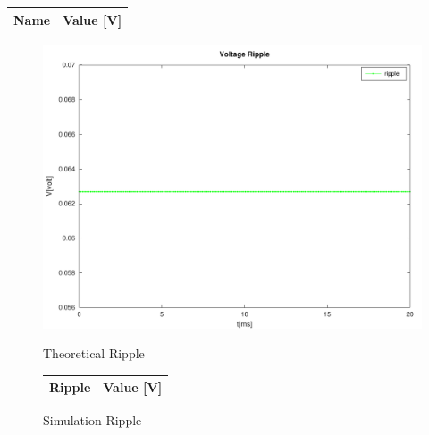 \begin{center}
  \begin{tabular}{ | c | c | }
    \hline    
    {\bf Name} & {\bf Value [V]} \\ \hline
    
  \end{tabular}
\end{center}

\begin{figure}[H]
      \includegraphics[width=\linewidth]{../mat/ripple.pdf}
      \caption{Theoretical Ripple}
    \endminipage\hfill
      \centering
      \begin{tabular}{ | c | c | }
      \hline    
      {\bf Ripple} & {\bf Value [V]} \\ \hline
      
      \end{tabular}
      \caption{Simulation Ripple}
    \endminipage\hfill
\end{figure}

